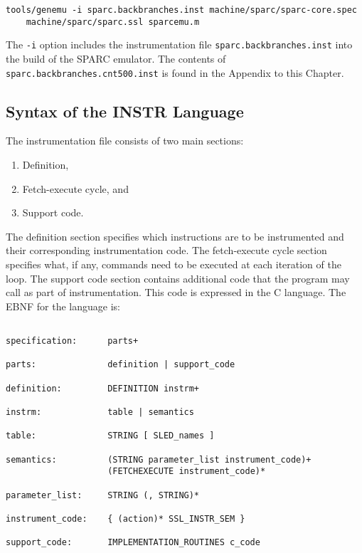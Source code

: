 \begin{verbatim}
tools/genemu -i sparc.backbranches.inst machine/sparc/sparc-core.spec 
    machine/sparc/sparc.ssl sparcemu.m
\end{verbatim}

The \texttt{-i} option includes the instrumentation file 
\texttt{sparc.backbranches.inst} into the build of the SPARC emulator.
The contents of \texttt{sparc.backbranches.cnt500.inst} is found in the 
Appendix to this Chapter.


\subsection{Syntax of the INSTR Language}

The instrumentation file consists of two main sections:
\begin{enumerate}
\item Definition, 
\item Fetch-execute cycle, and 
\item Support code.
\end{enumerate}

The definition section specifies which instructions are to be instrumented and 
their corresponding instrumentation code.  
The fetch-execute cycle section specifies what, if any, commands need to 
be executed at each iteration of the loop. 
The support code section contains additional code that the program may call 
as part of instrumentation.  This code is expressed in the C language.  
The EBNF for the language is: 

\begin{verbatim}

specification:      parts+

parts:              definition | support_code        

definition:	        DEFINITION instrm+

instrm:	            table | semantics

table:              STRING [ SLED_names ]

semantics:          (STRING parameter_list instrument_code)+ 
                    (FETCHEXECUTE instrument_code)*

parameter_list:	    STRING (, STRING)*

instrument_code:    { (action)* SSL_INSTR_SEM }

support_code:       IMPLEMENTATION_ROUTINES c_code

\end{verbatim}

